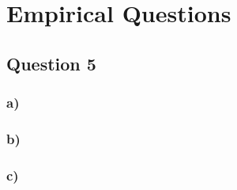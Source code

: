
\section*{Empirical Questions}
\subsection*{Question 5}


\subsubsection*{a)}
\noindent 


\subsubsection*{b)}
\noindent 


\subsubsection*{c)}
\noindent 
